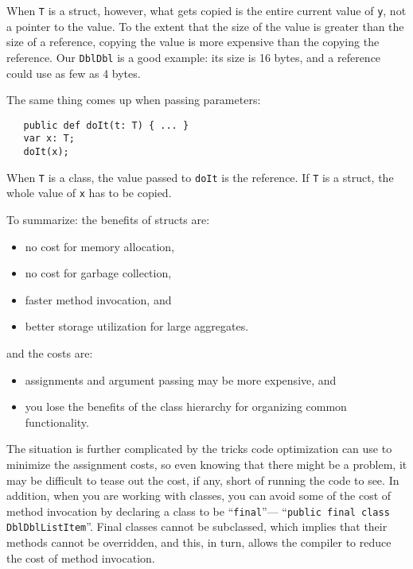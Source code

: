 When {\tt T} is a struct, however, what gets copied
is the entire current value of {\tt y}, not a pointer to the value.  To the
extent that the  size of the value is greater than the size of a reference,
copying the value is more expensive than the copying the reference.
Our {\tt DblDbl} is a good example: its size is 16 bytes, and a reference
could use as few as 4 bytes.

The same thing comes up when passing parameters:
\begin{verbatim}
   public def doIt(t: T) { ... }
   var x: T;
   doIt(x);
\end{verbatim}
When {\tt T} is a class, the value passed to {\tt doIt} is the reference.  If
{\tt T} is a struct, the whole value of {\tt x} has to be copied.
 
To summarize: the benefits of structs are:
\begin{itemize}
\item  no cost for memory allocation,
\item  no cost for garbage collection,
\item  faster method invocation, and
\item  better storage utilization for large aggregates.
\end{itemize}
and the costs are:

\begin{itemize} 
\item  assignments and argument passing may be more expensive, and
\item  you lose the benefits of the class hierarchy for organizing common
functionality.
\end{itemize}

The situation is further complicated by the tricks code optimization can use to
minimize the assignment costs, so even knowing that there might be a problem, it
may be difficult to tease out the cost, if any, short of running the code to
see. In addition, when you are working with classes, you can avoid some of the
cost of method invocation by declaring a class to be ``{\tt final}''---\eg{}
``{\tt public final class DblDblListItem}''.  Final classes cannot be
subclassed, which implies that their methods cannot be overridden, and this, in
turn, allows the compiler to reduce the cost of method invocation.
